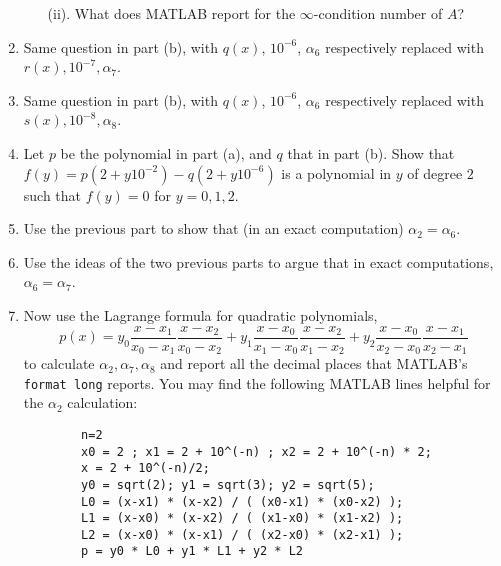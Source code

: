 \documentclass{article}
\begin{document}
\begin{enumerate}
\begin{enumerate}
			\item[(ii).] What does MATLAB report for the $\infty$-condition number of $A$?
		\end{enumerate}
	\item Same question in part (b), with $q(x)$, $10^{-6}$, $\alpha_6$
		respectively replaced with $r(x), 10^{-7}, \alpha_7$.
	\item Same question in part (b), with $q(x)$, $10^{-6}$, $\alpha_6$
		respectively replaced with $s(x), 10^{-8}, \alpha_8$.
	\item Let $p$ be the polynomial in part (a),
		and $q$ that in part (b).
		Show that $f(y) = p(2 + y10^{-2}) - q(2 + y10^{-6})$
		is a polynomial in $y$ of degree $2$ such that $f(y) = 0$ for $y = 0,1,2$.
	\item Use the previous part to show that (in an exact computation) $\alpha_2 = \alpha_6$.
	\item Use the ideas of the two previous parts to argue that in exact computations,
		$\alpha_6=\alpha_7$.
	\item Now use the Lagrange formula for quadratic polynomials,
		\[
			p(x) = y_0\frac{x-x_1}{x_0-x_1}\frac{x-x_2}{x_0-x_2}
			+ y_1\frac{x-x_0}{x_1-x_0}\frac{x-x_2}{x_1-x_2}
			+ y_2\frac{x-x_0}{x_2-x_0}\frac{x-x_1}{x_2-x_1}
		\]
		to calculate $\alpha_2,\alpha_7,\alpha_8$ and report
		all the decimal places that MATLAB's \verb|format long| reports.
		You may find the following MATLAB lines helpful for the $\alpha_2$ calculation:
		\begin{verbatim}
		n=2
		x0 = 2 ; x1 = 2 + 10^(-n) ; x2 = 2 + 10^(-n) * 2;
		x = 2 + 10^(-n)/2;
		y0 = sqrt(2); y1 = sqrt(3); y2 = sqrt(5);
		L0 = (x-x1) * (x-x2) / ( (x0-x1) * (x0-x2) );
		L1 = (x-x0) * (x-x2) / ( (x1-x0) * (x1-x2) );
		L2 = (x-x0) * (x-x1) / ( (x2-x0) * (x2-x1) );
		p = y0 * L0 + y1 * L1 + y2 * L2
		\end{verbatim}
\end{enumerate}
\end{document}
